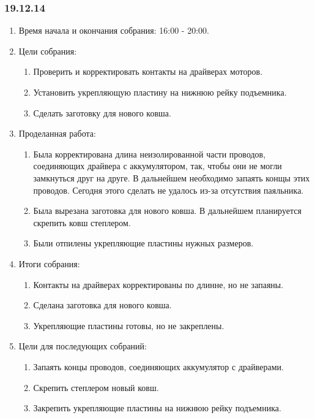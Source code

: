 \subsubsection{19.12.14}
\begin{enumerate}
	\item Время начала и окончания собрания: 16:00 - 20:00.
	\item Цели собрания:
	\begin{enumerate}
		\item Проверить и корректировать контакты на драйверах моторов.
		
		\item Установить укрепляющую пластину на нижнюю рейку подъемника.
		
		\item Сделать заготовку для нового ковша.
		
	\end{enumerate}
	
	\item Проделанная работа:
	\begin{enumerate}
		\item Была корректирована длина неизолированной части проводов, соединяющих драйвера с аккумулятором, так, чтобы они не могли замкнуться друг на друге. В дальнейшем необходимо запаять конщы этих проводов. Сегодня этого сделать не удалось из-за отсутствия паяльника.
		
		\item Была вырезана заготовка для нового ковша. В дальнейшем планируется скрепить ковш степлером.
		
		\item Были отпилены укрепляющие пластины нужных размеров.   
		
	\end{enumerate}
	\item Итоги собрания:
	\begin{enumerate}
		\item Контакты на драйверах корректированы по длинне, но не запаяны.
		
		\item Сделана заготовка для нового ковша.
		
		\item Укрепляющие пластины готовы, но не закреплены.
		
	\end{enumerate}
	
	\item Цели для последующих собраний:
	\begin{enumerate}
		\item Запаять концы проводов, соединяющих аккумулятор с драйверами.
		
		\item Скрепить степлером новый ковш.
		
		\item Закрепить укрепляющие пластины на нижнюю рейку подъемника.
		
	\end{enumerate}
	
\end{enumerate}
\fillpage